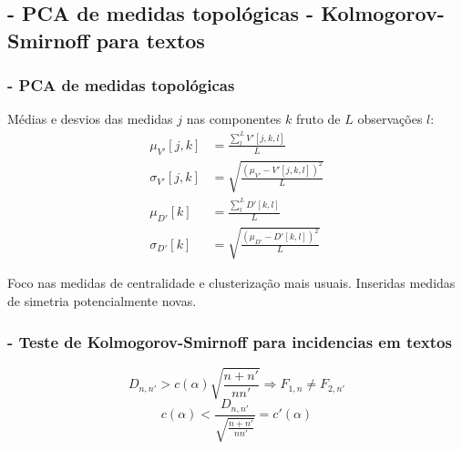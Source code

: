 \documentclass[10pt]{beamer}
\begin{document}
\begin{frame}
\subsection{- PCA de medidas topológicas \;\; - Kolmogorov-Smirnoff para textos}
\frametitle{- PCA de medidas topológicas}
Médias e desvios das medidas $j$ nas componentes $k$ fruto de $L$ observações $l$:
\begin{align}\label{eq:pca}
\mu_{V'}[j,k]   &=\frac{\sum_l^L V'[j,k,l]}{L}\nonumber\\
\sigma_{V'}[j,k]&=\sqrt{\frac{(\mu_{V'}-V'[j,k,l])^2}{L}}\\\nonumber
\mu_{D'}[k]&=\frac{\sum_l^L D'[k,l]}{L}\\\nonumber
\sigma_{D'}[k]&=\sqrt{\frac{(\mu_{D'}-D'[k,l])^2}{L}}
\end{align}

Foco nas medidas de centralidade e clusterização mais usuais. 
Inseridas medidas de simetria potencialmente novas.

\end{frame}
\begin{frame}
\frametitle{- Teste de Kolmogorov-Smirnoff para incidencias em textos}
\begin{equation}\label{eq:ks}
D_{n,n'} > c(\alpha)\sqrt{\frac{n+n'}{nn'}} \Rightarrow F_{1,n} \neq F_{2,n'}
\end{equation}
\vspace{2cm}
\begin{equation}\label{eq:ks}
c(\alpha) < \frac{D_{n,n'}}{\sqrt{\frac{n+n'}{nn'}}} = c'(\alpha)
\end{equation}
\end{frame}
\end{document}

